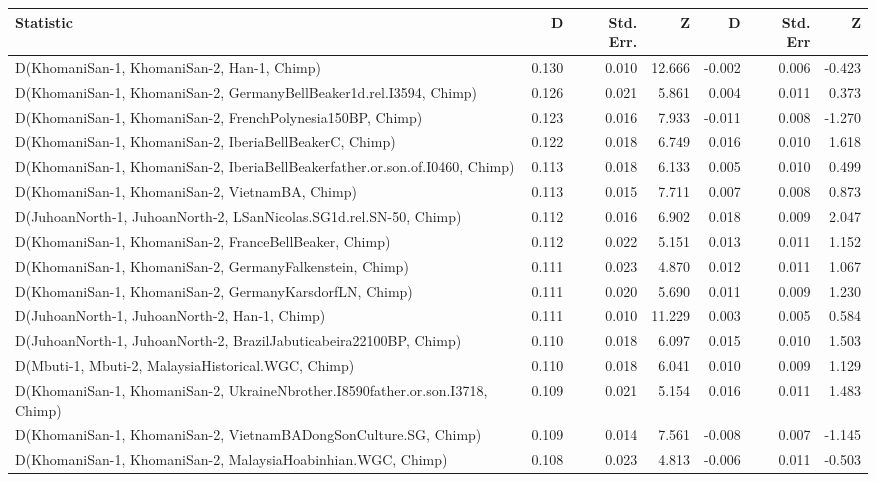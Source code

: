 \begin{table}[ht]
\centering
\begin{tabular}{lrrrrrr}
  \hline
Statistic & D & Std. Err. & Z & D & Std. Err & Z \\ 
  \hline
D(KhomaniSan-1, KhomaniSan-2, Han-1, Chimp) & 0.130 & 0.010 & 12.666 & -0.002 & 0.006 & -0.423 \\ 
  D(KhomaniSan-1, KhomaniSan-2, GermanyBellBeaker1d.rel.I3594, Chimp) & 0.126 & 0.021 & 5.861 & 0.004 & 0.011 & 0.373 \\ 
  D(KhomaniSan-1, KhomaniSan-2, FrenchPolynesia150BP, Chimp) & 0.123 & 0.016 & 7.933 & -0.011 & 0.008 & -1.270 \\ 
  D(KhomaniSan-1, KhomaniSan-2, IberiaBellBeakerC, Chimp) & 0.122 & 0.018 & 6.749 & 0.016 & 0.010 & 1.618 \\ 
  D(KhomaniSan-1, KhomaniSan-2, IberiaBellBeakerfather.or.son.of.I0460, Chimp) & 0.113 & 0.018 & 6.133 & 0.005 & 0.010 & 0.499 \\ 
  D(KhomaniSan-1, KhomaniSan-2, VietnamBA, Chimp) & 0.113 & 0.015 & 7.711 & 0.007 & 0.008 & 0.873 \\ 
  D(JuhoanNorth-1, JuhoanNorth-2, LSanNicolas.SG1d.rel.SN-50, Chimp) & 0.112 & 0.016 & 6.902 & 0.018 & 0.009 & 2.047 \\ 
  D(KhomaniSan-1, KhomaniSan-2, FranceBellBeaker, Chimp) & 0.112 & 0.022 & 5.151 & 0.013 & 0.011 & 1.152 \\ 
  D(KhomaniSan-1, KhomaniSan-2, GermanyFalkenstein, Chimp) & 0.111 & 0.023 & 4.870 & 0.012 & 0.011 & 1.067 \\ 
  D(KhomaniSan-1, KhomaniSan-2, GermanyKarsdorfLN, Chimp) & 0.111 & 0.020 & 5.690 & 0.011 & 0.009 & 1.230 \\ 
  D(JuhoanNorth-1, JuhoanNorth-2, Han-1, Chimp) & 0.111 & 0.010 & 11.229 & 0.003 & 0.005 & 0.584 \\ 
  D(JuhoanNorth-1, JuhoanNorth-2, BrazilJabuticabeira22100BP, Chimp) & 0.110 & 0.018 & 6.097 & 0.015 & 0.010 & 1.503 \\ 
  D(Mbuti-1, Mbuti-2, MalaysiaHistorical.WGC, Chimp) & 0.110 & 0.018 & 6.041 & 0.010 & 0.009 & 1.129 \\ 
  D(KhomaniSan-1, KhomaniSan-2, UkraineNbrother.I8590father.or.son.I3718, Chimp) & 0.109 & 0.021 & 5.154 & 0.016 & 0.011 & 1.483 \\ 
  D(KhomaniSan-1, KhomaniSan-2, VietnamBADongSonCulture.SG, Chimp) & 0.109 & 0.014 & 7.561 & -0.008 & 0.007 & -1.145 \\ 
  D(KhomaniSan-1, KhomaniSan-2, MalaysiaHoabinhian.WGC, Chimp) & 0.108 & 0.023 & 4.813 & -0.006 & 0.011 & -0.503 \\ 

\end{tabular}
\end{table}
